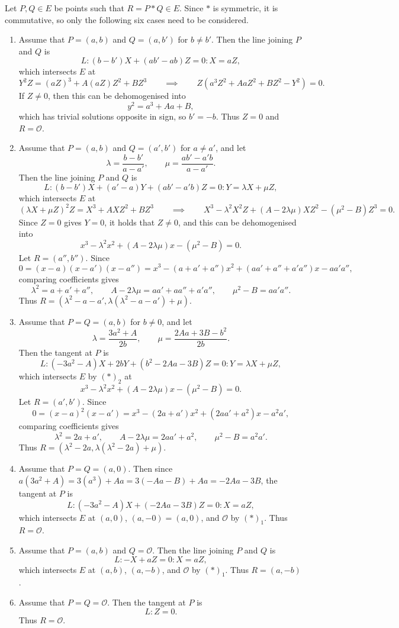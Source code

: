 \documentclass{article}
\newcommand{\rb}[1]{\left( #1 \right)}
\theoremstyle{definition}
\begin{document}
Let $ P, Q \in E $ be points such that $ R = P * Q \in E $. Since $ * $ is symmetric, it is commutative, so only the following six cases need to be considered.
\begin{enumerate}[label=$ \rb{*}_\arabic* $]
\item Assume that $ P = \rb{a, b} $ and $ Q = \rb{a, b'} $ for $ b \ne b' $. Then the line joining $ P $ and $ Q $ is
$$ L : \rb{b - b'}X + \rb{ab' - ab}Z = 0 : X = aZ, $$
which intersects $ E $ at
$$ Y^2Z = \rb{aZ}^3 + A\rb{aZ}Z^2 + BZ^3 \qquad \implies \qquad Z\rb{a^3Z^2 + AaZ^2 + BZ^2 - Y^2} = 0. $$
If $ Z \ne 0 $, then this can be dehomogenised into
$$ y^2 = a^3 + Aa + B, $$
which has trivial solutions opposite in sign, so $ b' = -b $. Thus $ Z = 0 $ and $ R = \mathcal{O} $.
\item Assume that $ P = \rb{a, b} $ and $ Q = \rb{a', b'} $ for $ a \ne a' $, and let
$$ \lambda = \dfrac{b - b'}{a - a'}, \qquad \mu = \dfrac{ab' - a'b}{a - a'}. $$
Then the line joining $ P $ and $ Q $ is
$$ L : \rb{b - b'}X + \rb{a' - a}Y + \rb{ab' - a'b}Z = 0 : Y = \lambda X + \mu Z, $$
which intersects $ E $ at
$$ \rb{\lambda X + \mu Z}^2Z = X^3 + AXZ^2 + BZ^3 \qquad \implies \qquad X^3 - \lambda^2X^2Z + \rb{A - 2\lambda\mu}XZ^2 - \rb{\mu^2 - B}Z^3 = 0. $$
Since $ Z = 0 $ gives $ Y = 0 $, it holds that $ Z \ne 0 $, and this can be dehomogenised into
$$ x^3 - \lambda^2x^2 + \rb{A - 2\lambda\mu}x - \rb{\mu^2 - B} = 0. $$
Let $ R = \rb{a'', b''} $. Since
$$ 0 = \rb{x - a}\rb{x - a'}\rb{x - a''} = x^3 - \rb{a + a' + a''}x^2 + \rb{aa' + a'' + a'a''}x - aa'a'', $$
comparing coefficients gives
$$ \lambda^2 = a + a' + a'', \qquad A - 2\lambda\mu = aa' + aa'' + a'a'', \qquad \mu^2 - B = aa'a''. $$
Thus $ R = \rb{\lambda^2 - a - a', \lambda\rb{\lambda^2 - a - a'} + \mu} $.
\item Assume that $ P = Q = \rb{a, b} $ for $ b \ne 0 $, and let
$$ \lambda = \dfrac{3a^2 + A}{2b}, \qquad \mu = \dfrac{2Aa + 3B - b^2}{2b}. $$
Then the tangent at $ P $ is
$$ L : \rb{-3a^2 - A}X + 2bY + \rb{b^2 - 2Aa - 3B}Z = 0 : Y = \lambda X + \mu Z, $$
which intersects $ E $ by $ \rb{*}_2 $ at
$$ x^3 - \lambda^2x^2 + \rb{A - 2\lambda\mu}x - \rb{\mu^2 - B} = 0. $$
Let $ R = \rb{a', b'} $. Since
$$ 0 = \rb{x - a}^2\rb{x - a'} = x^3 - \rb{2a + a'}x^2 + \rb{2aa' + a^2}x - a^2a', $$
comparing coefficients gives
$$ \lambda^2 = 2a + a', \qquad A - 2\lambda\mu = 2aa' + a^2, \qquad \mu^2 - B = a^2a'. $$
Thus $ R = \rb{\lambda^2 - 2a, \lambda\rb{\lambda^2 - 2a} + \mu} $.
\item Assume that $ P = Q = \rb{a, 0} $. Then since $ a\rb{3a^2 + A} = 3\rb{a^3} + Aa = 3\rb{-Aa - B} + Aa = -2Aa - 3B $, the tangent at $ P $ is
$$ L : \rb{-3a^2 - A}X + \rb{-2Aa - 3B}Z = 0 : X = aZ, $$
which intersects $ E $ at $ \rb{a, 0} $, $ \rb{a, -0} = \rb{a, 0} $, and $ \mathcal{O} $ by $ \rb{*}_1 $. Thus $ R = \mathcal{O} $.
\item Assume that $ P = \rb{a, b} $ and $ Q = \mathcal{O} $. Then the line joining $ P $ and $ Q $ is
$$ L : -X + aZ = 0 : X = aZ, $$
which intersects $ E $ at $ \rb{a, b} $, $ \rb{a, -b} $, and $ \mathcal{O} $ by $ \rb{*}_1 $. Thus $ R = \rb{a, -b} $.
\item Assume that $ P = Q = \mathcal{O} $. Then the tangent at $ P $ is
$$ L : Z = 0. $$
Thus $ R = \mathcal{O} $.
\end{enumerate}
\end{document}
